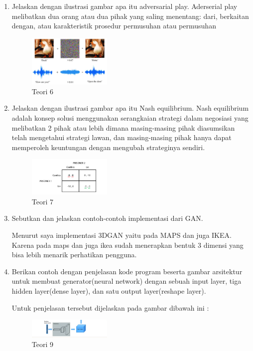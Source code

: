 \begin{enumerate}
	\item Jelaskan dengan ilustrasi gambar apa itu adversarial play.
	\hfill\break
	Aderserial play 
    melibatkan dua orang atau dua pihak yang saling 
    menentang: dari, berkaitan dengan, 
    atau karakteristik prosedur permusuhan atau 
    permusuhan 
	\begin{figure}[H]
	\centering
		\includegraphics[width=4cm]{figures/1174012/chapter8/T6.PNG}
		\caption{Teori 6}
	\end{figure}

	\item Jelaskan dengan ilustrasi gambar apa itu Nash equilibrium.
	\hfill\break
	Nash equilibrium adalah konsep solusi 
    menggunakan serangkaian strategi dalam negosiasi 
    yang melibatkan 2 pihak atau lebih dimana 
    masing-masing pihak diasumsikan telah mengetahui 
    strategi lawan, dan masing-masing pihak hanya dapat 
    memperoleh keuntungan dengan mengubah strateginya 
    sendiri.

	\begin{figure}[H]
	\centering
		\includegraphics[width=4cm]{figures/1174012/chapter8/T7.PNG}
		\caption{Teori 7}
	\end{figure}

	\item Sebutkan dan jelaskan contoh-contoh implementasi dari GAN.

	\hfill\break
	Menurut saya implementasi 3DGAN yaitu pada MAPS dan juga IKEA. Karena pada maps dan juga ikea sudah menerapkan bentuk 3 dimensi yang bisa lebih menarik perhatikan pengguna.

	\item Berikan contoh dengan penjelasan kode program beserta gambar arsitektur untuk membuat generator(neural network) dengan sebuah input layer, tiga hidden layer(dense layer), dan satu output layer(reshape layer).
	\hfill\break

	Untuk penjelasan tersebut dijelaskan pada gambar dibawah ini :

	\begin{figure}[H]
	\centering
		\includegraphics[width=4cm]{figures/1174012/chapter8/T9.PNG}
		\caption{Teori 9}
	\end{figure}


\end{enumerate}
